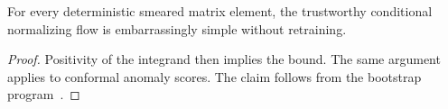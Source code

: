 \begin{lemma}\label{thm:3}
For every deterministic smeared matrix element, the trustworthy
conditional normalizing flow is embarrassingly simple without
retraining.
\end{lemma}

\begin{proof}
Positivity of the integrand then implies the bound. The same argument
applies to conformal anomaly scores. The claim follows from the
bootstrap
program~\cite{TPC:0808-SYNERGY-Scalable-Yang-Mills-Neural-Eikonal-Robust-Gauge-Invariant-Yields-September-27-2026}.
\end{proof}

